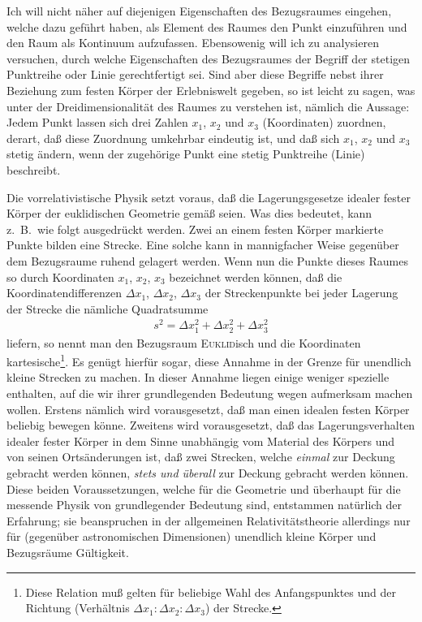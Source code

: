Ich will nicht näher auf diejenigen Eigenschaften des Bezugsraumes eingehen, 
welche dazu geführt haben, als Element des Raumes den Punkt einzuführen und den 
Raum als Kontinuum aufzufassen. Ebensowenig will ich zu analysieren versuchen, 
durch welche Eigenschaften des Bezugsraumes der Begriff der stetigen Punktreihe 
oder Linie gerechtfertigt sei. Sind aber diese Begriffe nebst ihrer Beziehung 
zum festen Körper der Erlebniswelt gegeben, so ist leicht zu sagen, was unter 
der Dreidimensionalität des Raumes zu verstehen ist, nämlich die Aussage: Jedem 
Punkt lassen sich drei Zahlen $x_1$, $x_2$ und $x_3$ (Koordinaten) zuordnen, 
derart, daß diese Zuordnung umkehrbar eindeutig ist, und daß sich $x_1$, $x_2$ 
und $x_3$ stetig ändern, wenn der zugehörige Punkt eine stetig Punktreihe 
(Linie) beschreibt.

Die vorrelativistische Physik setzt voraus, daß die Lagerungsgesetze idealer 
fester Körper der euklidischen Geometrie gemäß seien. Was dies bedeutet, kann 
z.\ B.\ wie folgt ausgedrückt werden. Zwei an einem festen Körper markierte 
Punkte bilden eine Strecke. Eine solche kann in mannigfacher Weise gegenüber dem 
Bezugsraume ruhend gelagert werden. Wenn nun die Punkte dieses Raumes so durch 
Koordinaten $x_1$, $x_2$, $x_3$ bezeichnet werden können, daß die 
Koordinatendifferenzen $\Delta x_1$, $\Delta x_2$, $\Delta x_3$ der 
Streckenpunkte bei jeder Lagerung der Strecke die nämliche Quadratsumme
\begin{align}
	s^2 = \Delta x_1^2 + \Delta x_2^2 + \Delta x_3^2
	\label{eq:1}
\end{align}
liefern, so nennt man den Bezugsraum \textsc{Euklid}isch und die Koordinaten 
kartesische\footnote{Diese Relation muß gelten für beliebige Wahl des 
Anfangspunktes und der Richtung (Verhältnis $\Delta x_1 : \Delta x_2 : \Delta 
x_3$) der Strecke.}. Es genügt hierfür sogar, diese Annahme in der Grenze für 
unendlich kleine Strecken zu machen. In dieser Annahme liegen einige weniger 
spezielle enthalten, auf die wir ihrer grundlegenden Bedeutung wegen aufmerksam 
machen wollen. Erstens nämlich wird vorausgesetzt, daß man einen idealen festen 
Körper beliebig bewegen könne. Zweitens wird vorausgesetzt, daß das 
Lagerungsverhalten idealer fester Körper in dem Sinne unabhängig vom Material 
des Körpers und von seinen Ortsänderungen ist, daß zwei Strecken, welche 
\emph{einmal} zur Deckung gebracht werden können, \emph{stets und überall} zur 
Deckung gebracht werden können. Diese beiden Voraussetzungen, welche für die 
Geometrie und überhaupt für die messende Physik von grundlegender Bedeutung 
sind, entstammen natürlich der Erfahrung; sie beanspruchen in der allgemeinen 
Relativitätstheorie allerdings nur für (gegenüber astronomischen Dimensionen) 
unendlich kleine Körper und Bezugsräume Gültigkeit.

